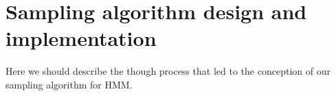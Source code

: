 \chapter{Sampling algorithm design and implementation}

Here we should describe the though process that led to the conception of our sampling algorithm for HMM.